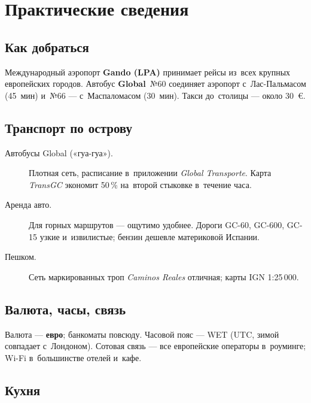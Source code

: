\chapter{Практические сведения}

\section{Как добраться}


Международный аэропорт \textbf{Gando (LPA)} принимает рейсы из~всех
крупных европейских городов. Автобус \textbf{Global}~№60 соединяет
аэропорт с~Лас-Пальмасом (45~мин) и~№66 --- с~Маспаломасом (30~мин).
Такси до~столицы --- около 30~€.

\section{Транспорт по острову}

\begin{description}
\item[Автобусы Global («гуа-гуа»).] Плотная сеть, расписание
  в~приложении \textit{Global Transporte}. Карта \textit{TransGC}
  экономит 50\,\% на~второй стыковке в~течение часа.
\item[Аренда авто.] Для горных маршрутов --- ощутимо удобнее.
  Дороги GC-60, GC-600, GC-15 узкие и~извилистые; бензин дешевле
  материковой Испании.
\item[Пешком.] Сеть маркированных троп \textit{Caminos Reales}
  отличная; карты IGN 1:25\,000.
\end{description}

\section{Валюта, часы, связь}

Валюта --- \textbf{евро}; банкоматы повсюду. Часовой пояс ---
WET (UTC, зимой совпадает с~Лондоном). Сотовая связь --- все
европейские операторы в~роуминге; Wi-Fi в~большинстве
отелей и~кафе.

\section{Кухня}


